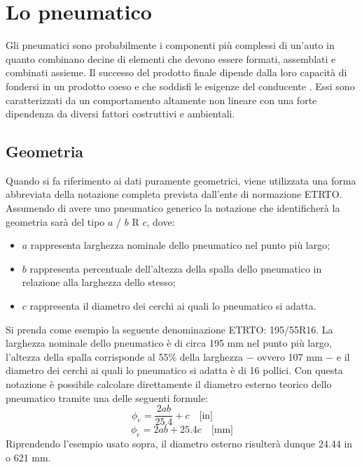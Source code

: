 \chapter{Lo pneumatico}
\label{Pneumatico}
%
Gli pneumatici sono probabilmente i componenti più complessi di un'auto in quanto combinano decine di elementi che devono essere formati, assemblati e combinati assieme. Il successo del prodotto finale dipende dalla loro capacità di fondersi in un prodotto coeso e che soddisfi le esigenze del conducente \cite{rill}. Essi sono caratterizzati da un comportamento altamente non lineare con una forte dipendenza da diversi fattori costruttivi e ambientali.
%
\section{Geometria}
Quando si fa riferimento ai dati puramente geometrici, viene utilizzata una forma abbreviata della notazione completa prevista dall'ente di normazione \ac{ETRTO}. Assumendo di avere uno pneumatico generico la notazione che identificherà la geometria sarà del tipo $a$ / $b$ R $c$, dove:
\begin{itemize}
	\item $a$ rappresenta larghezza nominale dello pneumatico nel punto più largo;
	\item $b$ rappresenta percentuale dell'altezza della spalla dello pneumatico in relazione alla larghezza dello stesso;
	\item $c$ rappresenta il diametro dei cerchi ai quali lo pneumatico si adatta.
\end{itemize}
Si prenda come esempio la seguente denominazione \ac{ETRTO}: 195/55R16. La larghezza nominale dello pneumatico è di circa 195 mm nel punto più largo, l'altezza della spalla corrisponde al 55\% della larghezza $-$ ovvero 107 mm $-$ e il diametro dei cerchi ai quali lo pneumatico si adatta è di 16 pollici. Con questa notazione è possibile calcolare direttamente il diametro esterno teorico dello pneumatico tramite una delle seguenti formule:
%
\begin{equation}
\phi_e = \frac{2ab}{25.4}+c \quad \text{[in]} \qquad
\end{equation}
\begin{equation}
\phi_e = 2ab+25.4c \quad \text{[mm]}
\end{equation}
%
Riprendendo l'esempio usato sopra, il diametro esterno risulterà dunque 24.44 in o 621 mm.\\
